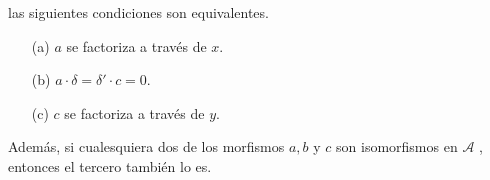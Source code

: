 \documentclass[preview]{standalone}
\begin{document}
\begin{center}
\justifying las siguientes condiciones son equivalentes. \begin{itemize} \item[(a)] $a$ se factoriza a través de $x$. \item[(b)] $a\cdot\delta = \delta'\cdot c = 0$. \item[(c)] $c$ se factoriza a través de $y$. \end{itemize}Además, si cualesquiera dos de los morfismos $a, b$ y $c$ son isomorfismos en $\mathscr{A}$ , entonces el tercero también lo es.
\end{center}
\end{document}
